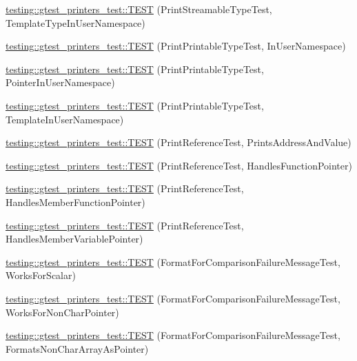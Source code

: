 \begin{DoxyCompactItemize}
\item 
\hyperlink{namespacetesting_1_1gtest__printers__test_a8ccd96504d676671a0429073d5012ff1}{testing\+::gtest\+\_\+printers\+\_\+test\+::\+T\+E\+ST} (Print\+Streamable\+Type\+Test, Template\+Type\+In\+User\+Namespace)
\item 
\hyperlink{namespacetesting_1_1gtest__printers__test_a52f5df394111bcc55aecc59ce426088d}{testing\+::gtest\+\_\+printers\+\_\+test\+::\+T\+E\+ST} (Print\+Printable\+Type\+Test, In\+User\+Namespace)
\item 
\hyperlink{namespacetesting_1_1gtest__printers__test_a3da6191eff6b016540024c2bfccdd90b}{testing\+::gtest\+\_\+printers\+\_\+test\+::\+T\+E\+ST} (Print\+Printable\+Type\+Test, Pointer\+In\+User\+Namespace)
\item 
\hyperlink{namespacetesting_1_1gtest__printers__test_aa697a3cf25b7f51f26ab49ed8ac3dd31}{testing\+::gtest\+\_\+printers\+\_\+test\+::\+T\+E\+ST} (Print\+Printable\+Type\+Test, Template\+In\+User\+Namespace)
\item 
\hyperlink{namespacetesting_1_1gtest__printers__test_aeae9b61a9fe582c72580db1466631846}{testing\+::gtest\+\_\+printers\+\_\+test\+::\+T\+E\+ST} (Print\+Reference\+Test, Prints\+Address\+And\+Value)
\item 
\hyperlink{namespacetesting_1_1gtest__printers__test_aab47074bb60b087e80675a44ad8c88ba}{testing\+::gtest\+\_\+printers\+\_\+test\+::\+T\+E\+ST} (Print\+Reference\+Test, Handles\+Function\+Pointer)
\item 
\hyperlink{namespacetesting_1_1gtest__printers__test_a88f9089e0b19be4bda74a953d6a47d7b}{testing\+::gtest\+\_\+printers\+\_\+test\+::\+T\+E\+ST} (Print\+Reference\+Test, Handles\+Member\+Function\+Pointer)
\item 
\hyperlink{namespacetesting_1_1gtest__printers__test_af9c63486049ac0ec2a1db65904702eb3}{testing\+::gtest\+\_\+printers\+\_\+test\+::\+T\+E\+ST} (Print\+Reference\+Test, Handles\+Member\+Variable\+Pointer)
\item 
\hyperlink{namespacetesting_1_1gtest__printers__test_aa7429c3701e464d0047a82686a5e8a46}{testing\+::gtest\+\_\+printers\+\_\+test\+::\+T\+E\+ST} (Format\+For\+Comparison\+Failure\+Message\+Test, Works\+For\+Scalar)
\item 
\hyperlink{namespacetesting_1_1gtest__printers__test_adb093d9323bfb766be8c91215c46056e}{testing\+::gtest\+\_\+printers\+\_\+test\+::\+T\+E\+ST} (Format\+For\+Comparison\+Failure\+Message\+Test, Works\+For\+Non\+Char\+Pointer)
\item 
\hyperlink{namespacetesting_1_1gtest__printers__test_a3571808f93f419268b6aed1aa127ea30}{testing\+::gtest\+\_\+printers\+\_\+test\+::\+T\+E\+ST} (Format\+For\+Comparison\+Failure\+Message\+Test, Formats\+Non\+Char\+Array\+As\+Pointer)

\end{DoxyCompactItemize}

